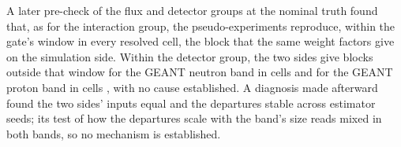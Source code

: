 A later pre-check of the flux and detector groups at the nominal truth found that, as for the interaction group, the pseudo-experiments reproduce, within the gate's window in every resolved cell, the block that the same weight factors give on the simulation side. Within the detector group, the two sides give blocks outside that window for the GEANT neutron band in cells  and for the GEANT proton band in cells , with no cause established. A diagnosis made afterward found the two sides' inputs equal and the departures stable across estimator seeds; its test of how the departures scale with the band's size reads mixed in both bands, so no mechanism is established.
